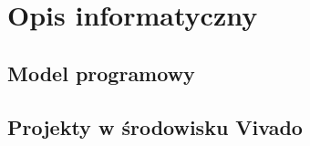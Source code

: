 \chapter{Opis informatyczny}
\label{appx:opis_informatyczny}

\section*{Model programowy}

\section*{Projekty w środowisku Vivado}